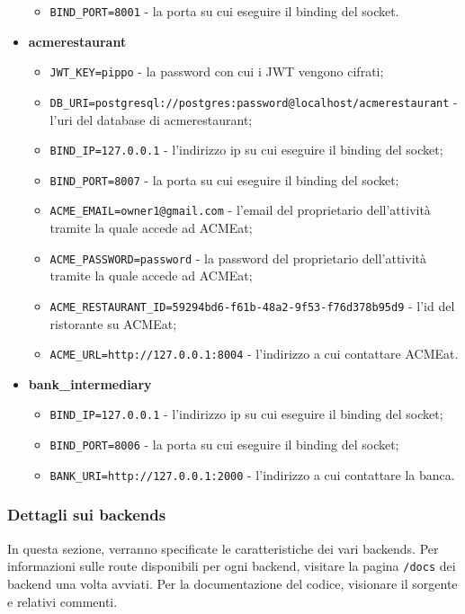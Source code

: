 \documentclass[11pt]{article} %
\begin{document}
\begin{itemize}
\begin{itemize}
\item \verb|BIND_PORT=8001| - la porta su cui eseguire il binding del socket.
\end{itemize}
\item \textbf{acmerestaurant}
\begin{itemize}
\item \verb|JWT_KEY=pippo| - la password con cui i JWT vengono cifrati;
\item \verb|DB_URI=postgresql://postgres:password@localhost/acmerestaurant| - l'uri del database di acmerestaurant;
\item \verb|BIND_IP=127.0.0.1| - l'indirizzo ip su cui eseguire il binding del socket;
\item \verb|BIND_PORT=8007| - la porta su cui eseguire il binding del socket;
\item \verb|ACME_EMAIL=owner1@gmail.com| - l'email del proprietario dell'attività tramite la quale accede ad ACMEat;
\item \verb|ACME_PASSWORD=password| - la password del proprietario dell'attività tramite la quale accede ad ACMEat;
\item \verb|ACME_RESTAURANT_ID=59294bd6-f61b-48a2-9f53-f76d378b95d9| - l'id del ristorante su ACMEat;
\item \verb|ACME_URL=http://127.0.0.1:8004| - l'indirizzo a cui contattare ACMEat.
\end{itemize}
\item \textbf{bank\_intermediary}
\begin{itemize}
\item \verb|BIND_IP=127.0.0.1| - l'indirizzo ip su cui eseguire il binding del socket;
\item \verb|BIND_PORT=8006| - la porta su cui eseguire il binding del socket;
\item \verb|BANK_URI=http://127.0.0.1:2000| - l'indirizzo a cui contattare la banca.
\end{itemize}
\end{itemize}

\subsubsection{Dettagli sui backends}

In questa sezione, verranno specificate le caratteristiche dei vari backends. Per informazioni sulle route disponibili per ogni backend, visitare la pagina \verb|/docs| dei backend una volta avviati. Per la documentazione del codice, visionare il sorgente e relativi commenti.
\end{document}
